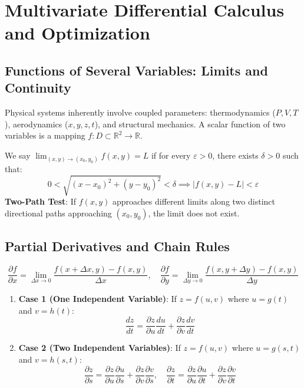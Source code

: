 \chapter{Multivariate Differential Calculus and Optimization}
\label{chap:multivariate-calculus}

\section{Functions of Several Variables: Limits and Continuity}
Physical systems inherently involve coupled parameters: thermodynamics ($P, V, T$), aerodynamics ($x, y, z, t$), and structural mechanics.
A scalar function of two variables is a mapping $f: D \subset \mathbb{R}^2 \to \mathbb{R}$.

\begin{definition}
We say $\lim_{(x,y)\to(x_0,y_0)} f(x,y) = L$ if for every $\varepsilon > 0$, there exists $\delta > 0$ such that:
\begin{equation}
0 < \sqrt{(x - x_0)^2 + (y - y_0)^2} < \delta \implies |f(x,y) - L| < \varepsilon
\end{equation}
\textbf{Two-Path Test}: If $f(x,y)$ approaches different limits along two distinct directional paths approaching $(x_0, y_0)$, the limit does not exist.
\end{definition}

\section{Partial Derivatives and Chain Rules}
\begin{definition}
\begin{equation}
\frac{\partial f}{\partial x} = \lim_{\Delta x \to 0} \frac{f(x + \Delta x, y) - f(x,y)}{\Delta x}, \quad \frac{\partial f}{\partial y} = \lim_{\Delta y \to 0} \frac{f(x, y + \Delta y) - f(x,y)}{\Delta y}
\end{equation}
\end{definition}

\begin{theorem}
\begin{enumerate}
    \item \textbf{Case 1 (One Independent Variable)}: If $z = f(u, v)$ where $u = g(t)$ and $v = h(t)$:
    \begin{equation}
    \frac{dz}{dt} = \frac{\partial z}{\partial u}\frac{du}{dt} + \frac{\partial z}{\partial v}\frac{dv}{dt}
    \end{equation}
    \item \textbf{Case 2 (Two Independent Variables)}: If $z = f(u, v)$ where $u = g(s, t)$ and $v = h(s, t)$:
    \begin{equation}
    \frac{\partial z}{\partial s} = \frac{\partial z}{\partial u}\frac{\partial u}{\partial s} + \frac{\partial z}{\partial v}\frac{\partial v}{\partial s}, \quad \frac{\partial z}{\partial t} = \frac{\partial z}{\partial u}\frac{\partial u}{\partial t} + \frac{\partial z}{\partial v}\frac{\partial v}{\partial t}
    \end{equation}
\end{enumerate}
\end{theorem}

